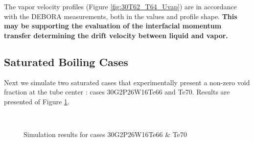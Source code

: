 \npar

The vapor velocity profiles (Figure \ref{fig:30T62_T64_Uvap}) are in accordance with the DEBORA measurements, both in the values and profile shape. \textbf{This may be supporting the evaluation of the interfacial momentum transfer determining the drift velocity between liquid and vapor.}


\subsection{Saturated Boiling Cases}

Next we simulate two saturated cases that experimentally present a non-zero void fraction at the tube center : cases 30G2P26W16Te66 and Te70. Results are presented of Figure \ref{fig:deb_cfd_30T66_T70}.

\begin{figure}[!h]
\centering
{}
\\
\caption{Simulation results for cases 30G2P26W16Te66 \& Te70}
\label{fig:deb_cfd_30T66_T70}
\end{figure}

